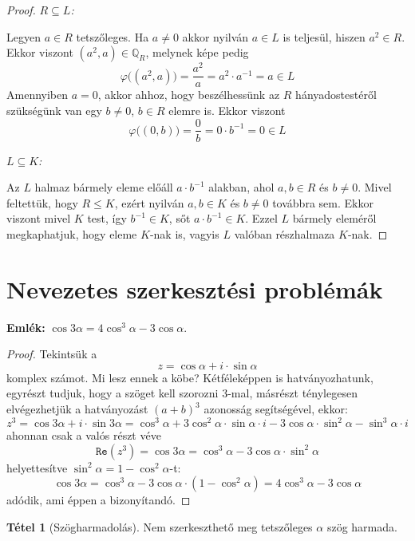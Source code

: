 \documentclass[12pt]{book}
\theoremstyle{plain} %
\theoremstyle{definition} %
\newtheorem{theo/}{Tétel}[section]
\newenvironment{theo}
  {\renewcommand{\qedsymbol}{$\clubsuit$}%
   \pushQED{\qed}\begin{theo/}}
  {\popQED\end{theo/}}
\theoremstyle{remark}
\renewcommand\qedsymbol{$\blacksquare$}
\numberwithin{equation}{section}  %
\begin{document}
\begin{proof}
		\textit{$R\subseteq L$:}
		
		Legyen $a\in R$ tetszőleges. Ha $a\neq 0$ akkor nyilván $a\in L$ is teljesül, hiszen $a^2\in R$. Ekkor viszont $(a^2,a)\in \mathbb{Q}_R$, melynek képe pedig
		\[ \varphi\Big((a^2,a)\Big) = \dfrac{a^2}{a} = a^2\cdot a^{-1} = a\in L  \]
		Amennyiben $a = 0$, akkor ahhoz, hogy beszélhessünk az $R$ hányadostestéről szükségünk van egy $b\neq 0$, $b\in R$ elemre is. Ekkor viszont
		\[ \varphi\Big((0,b)\Big) = \dfrac{0}{b} = 0\cdot b^{-1} = 0 \in L  \]
		
		\textit{$L\subseteq K$:}
		
		Az $L$ halmaz bármely eleme előáll $a\cdot b^{-1}$ alakban, ahol $a,b\in R$ és $b\neq 0$. Mivel feltettük, hogy $R\leq K$, ezért nyilván $a,b\in K$ és $b\neq 0$ továbbra sem. Ekkor viszont mivel $K$ test, így $b^{-1}\in K$, sőt $a\cdot b^{-1}\in K$. Ezzel $L$ bármely eleméről megkaphatjuk, hogy eleme $K$-nak is, vagyis $L$ valóban részhalmaza $K$-nak.
	\end{proof}
	
	\section{Nevezetes szerkesztési problémák}
	
	\textbf{Emlék:} $\cos{3\alpha} = 4\cos^3\alpha - 3\cos{\alpha}$.
	
	\begin{proof}
		Tekintsük a
		\[ z = \cos\alpha + i\cdot \sin\alpha  \]
		komplex számot. Mi lesz ennek a köbe? Kétféleképpen is hatványozhatunk, egyrészt tudjuk, hogy a szöget kell szorozni $3$-mal, másrészt ténylegesen elvégezhetjük a hatványozást $(a+b)^3$ azonosság segítségével, ekkor:
		\[ z^3 = \cos3\alpha + i\cdot \sin 3\alpha = \cos^3\alpha +3\cos^2\alpha \cdot \sin\alpha \cdot i - 3 \cos\alpha \cdot \sin^2 \alpha - \sin^3\alpha \cdot i  \]
		ahonnan csak a valós részt véve
		\[ \mathtt{Re}(z^3) = \cos 3\alpha = \cos^3 \alpha - 3\cos\alpha \cdot \sin^2\alpha \]
		helyettesítve $\sin^2\alpha = 1 - \cos^2\alpha$-t:
		\[ \cos 3\alpha = \cos^3\alpha - 3\cos \alpha \cdot (1-\cos^2\alpha) = 4\cos ^3 \alpha -3\cos \alpha  \]
		adódik, ami éppen a bizonyítandó.
	\end{proof}
	
	\begin{theo}[Szögharmadolás]
		Nem szerkeszthető meg tetszőleges $\alpha$ szög harmada.
	\end{theo}
	
\end{document}
